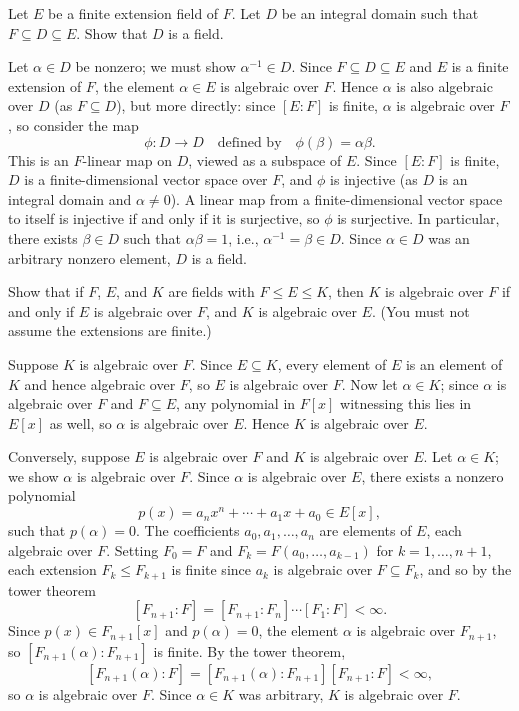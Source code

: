 \begin{problem}[40.26]
  Let $E$ be a finite extension field of $F$. Let $D$ be an integral domain such that $F \subseteq D \subseteq E$. Show that $D$ is a field.
\end{problem}

\begin{solution}
  Let $\alpha \in D$ be nonzero; we must show $\alpha^{-1} \in D$. Since $F \subseteq D \subseteq E$ and $E$ is a finite extension of $F$, the element $\alpha \in E$ is algebraic over $F$. Hence $\alpha$ is also algebraic over $D$ (as $F \subseteq D$), but more directly: since $[E : F]$ is finite, $\alpha$ is algebraic over $F$, so consider the map
  \[%
    \phi : D \to D \quad \text{defined by} \quad \phi(\beta) = \alpha \beta
  .\]%
  This is an $F$-linear map on $D$, viewed as a subspace of $E$. Since $[E:F]$ is finite, $D$ is a finite-dimensional vector space over $F$, and $\phi$ is injective (as $D$ is an integral domain and $\alpha \neq 0$). A linear map from a finite-dimensional vector space to itself is injective if and only if it is surjective, so $\phi$ is surjective. In particular, there exists $\beta \in D$ such that $\alpha \beta = 1$, i.e., $\alpha^{-1} = \beta \in D$. Since $\alpha \in D$ was an arbitrary nonzero element, $D$ is a field.
\end{solution}

\begin{problem}[40.31]
  Show that if $F$, $E$, and $K$ are fields with $F \le E \le K$, then $K$ is algebraic over $F$ if and only if $E$ is algebraic over $F$, and $K$ is algebraic over $E$. (You must not assume the extensions are finite.)
\end{problem}

\begin{solution}
  Suppose $K$ is algebraic over $F$. Since $E \subseteq K$, every element of $E$ is an element of $K$ and hence algebraic over $F$, so $E$ is algebraic over $F$. Now let $\alpha \in K$; since $\alpha$ is algebraic over $F$ and $F \subseteq E$, any polynomial in $F[x]$ witnessing this lies in $E[x]$ as well, so $\alpha$ is algebraic over $E$. Hence $K$ is algebraic over $E$.

  Conversely, suppose $E$ is algebraic over $F$ and $K$ is algebraic over $E$. Let $\alpha \in K$; we show $\alpha$ is algebraic over $F$. Since $\alpha$ is algebraic over $E$, there exists a nonzero polynomial
  \[%
    p(x) = a_n x^n + \cdots + a_1 x + a_0 \in E[x]
  ,\]%
  such that $p(\alpha) = 0$. The coefficients $a_0, a_1, \ldots, a_n$ are elements of $E$, each algebraic over $F$. Setting $F_0 = F$ and $F_k = F(a_0, \ldots, a_{k-1})$ for $k = 1, \ldots, n+1$, each extension $F_k \le F_{k+1}$ is finite since $a_k$ is algebraic over $F \subseteq F_k$, and so by the tower theorem
  \[%
    [F_{n+1} : F] = [F_{n+1} : F_n] \cdots [F_1 : F] < \infty
  .\]%
  Since $p(x) \in F_{n+1}[x]$ and $p(\alpha) = 0$, the element $\alpha$ is algebraic over $F_{n+1}$, so $[F_{n+1}(\alpha) : F_{n+1}]$ is finite. By the tower theorem,
  \[%
    [F_{n+1}(\alpha) : F] = [F_{n+1}(\alpha) : F_{n+1}][F_{n+1} : F] < \infty
  ,\]%
  so $\alpha$ is algebraic over $F$. Since $\alpha \in K$ was arbitrary, $K$ is algebraic over $F$.
\end{solution}

